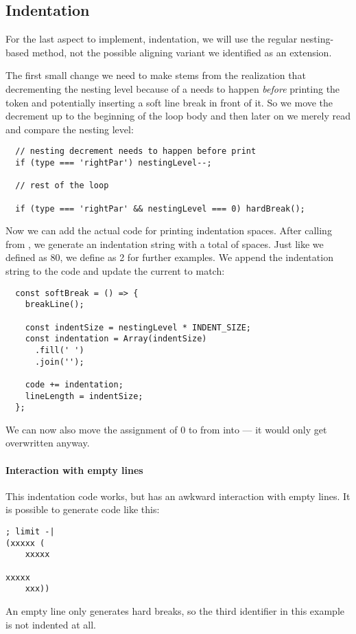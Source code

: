 \subsection{Indentation}
For the last aspect to implement, indentation,
we will use the regular nesting-based method,
not the possible aligning variant
we identified as an extension.

The first small change we need to make
stems from the realization that
decrementing the nesting level
because of a  needs to happen
\textit{before} printing the token
and potentially inserting a
soft line break in front of it.
So we move the decrement up
to the beginning of the loop body
and then later on we merely
read and compare the nesting level:
\begin{verbatim}
  // nesting decrement needs to happen before print
  if (type === 'rightPar') nestingLevel--;

  // rest of the loop

  if (type === 'rightPar' && nestingLevel === 0) hardBreak();
\end{verbatim}

Now we can add the actual code for printing indentation spaces.
After calling  from ,
we generate an indentation string with
a total of  spaces.
Just like we defined  as 80,
we define  as 2 for further examples.
We append the indentation string to the code
and update the current  to match:
\begin{verbatim}
  const softBreak = () => {
    breakLine();

    const indentSize = nestingLevel * INDENT_SIZE;
    const indentation = Array(indentSize)
      .fill(' ')
      .join('');

    code += indentation;
    lineLength = indentSize;
  };
\end{verbatim}
We can now also move the assignment of 0 to 
from  into  ---
it would only get overwritten anyway.

\paragraph{Interaction with empty lines}
This indentation code works,
but has an awkward interaction with empty lines.
It is possible to generate code like this:
\begin{verbatim}
; limit -|
(xxxxx (
    xxxxx

xxxxx
    xxx))
\end{verbatim}
An empty line only generates hard breaks,
so the third identifier in this example
is not indented at all.

